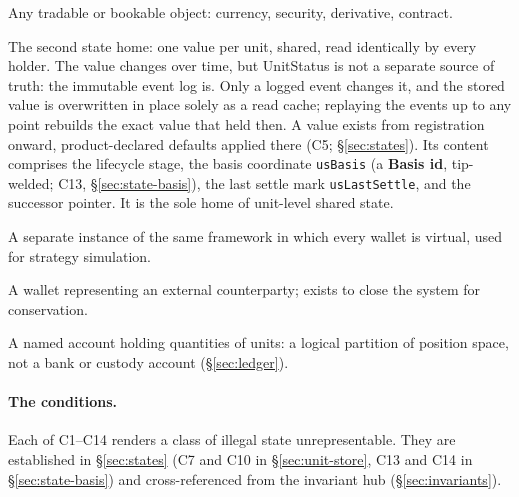 \begin{description}[style=nextline]
\item[Unit] Any tradable or bookable object: currency, security, derivative, contract.

\item[UnitStatus] The second state home: one value per unit, shared, read identically by every holder. The value changes over time, but UnitStatus is not a separate source of truth: the immutable event log is. Only a logged event changes it, and the stored value is overwritten in place solely as a read cache; replaying the events up to any point rebuilds the exact value that held then. A value exists from registration onward, product-declared defaults applied there (C5; \S\ref{sec:states}). Its content comprises the lifecycle stage, the basis coordinate \texttt{usBasis} (a \textbf{Basis id}, tip-welded; C13, \S\ref{sec:state-basis}), the last settle mark \texttt{usLastSettle}, and the successor pointer. It is the sole home of unit-level shared state.

\item[Virtual ledger] A separate instance of the same framework in which every wallet is virtual, used for strategy simulation.

\item[Virtual wallet] A wallet representing an external counterparty; exists to close the system for conservation.

\item[Wallet] A named account holding quantities of units: a logical partition of position space, not a bank or custody account (\S\ref{sec:ledger}).

\end{description}

\paragraph{The conditions.}
Each of C1--C14 renders a class of illegal state unrepresentable. They are established in \S\ref{sec:states} (C7 and C10 in \S\ref{sec:unit-store}, C13 and C14 in \S\ref{sec:state-basis}) and cross-referenced from the invariant hub (\S\ref{sec:invariants}).

